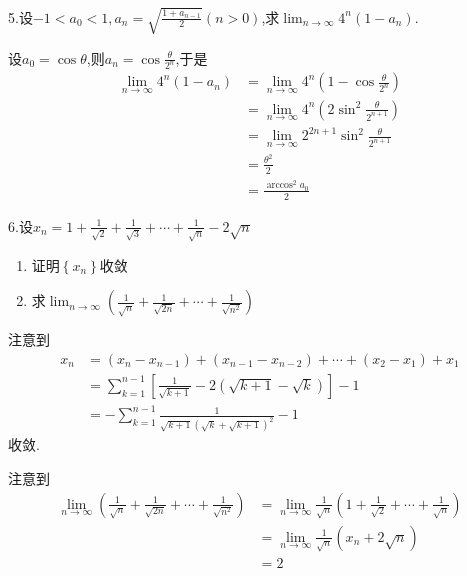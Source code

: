 5.设$\displaystyle -1<a_0<1,a_n=\sqrt{\frac{1+a_{n-1}}{2}}\left(n>0\right)$,求$\displaystyle\lim_{n\to\infty}4^n\left(1-a_n\right)$.
\begin{solution}
    设$a_0=\cos\theta$,则$\displaystyle a_n=\cos\frac{\theta}{2^n}$,于是\begin{align*}
        \lim_{n\to\infty}4^n\left(1-a_n\right)&=\lim_{n\to\infty}4^n\left(1-\cos\frac{\theta}{2^n}\right)\\
        &=\lim_{n\to\infty}4^n\left(2\sin^2\frac{\theta}{2^{n+1}}\right)\\
        &=\lim_{n\to\infty}2^{2n+1}\sin^2\frac{\theta}{2^{n+1}}\\
        &=\frac{\theta^2}{2}\\
        &=\frac{\arccos^2a_0}{2}
    \end{align*}
\end{solution}

6.设$\displaystyle x_n=1+\frac{1}{\sqrt{2}}+\frac{1}{\sqrt{3}}+\cdots+\frac{1}{\sqrt{n}}-2\sqrt{n}$\begin{enumerate}[label={\textup{(\arabic*)}}]
    \item 证明$\displaystyle\left\{x_n\right\}$收敛
    \item 求$\displaystyle\lim_{n\to\infty}\left(\frac{1}{\sqrt{n}}+\frac{1}{\sqrt{2n}}+\cdots+\frac{1}{\sqrt{n^2}}\right)$
\end{enumerate}
\begin{solution}
    注意到\begin{align*}
        x_n&=\left(
            x_{n}-x_{n-1}
        \right)+\left(
            x_{n-1}-x_{n-2}
        \right)+\cdots+\left(
            x_2-x_1
        \right)+x_1\\
        &=\sum_{k=1}^{n-1}\left[
            \frac{1}{\sqrt{k+1}}-2\left(
                \sqrt{k+1}-\sqrt{k}
            \right)
        \right]-1\\
        &=-\sum_{k=1}^{n-1}\frac{1}{\sqrt{k+1}\left(\sqrt{k}+\sqrt{k+1}\right)^2}-1
    \end{align*}收敛.

    注意到\begin{align*}
        \lim_{n\to\infty}\left(
            \frac{1}{\sqrt{n}}+\frac{1}{\sqrt{2n}}+\cdots+\frac{1}{\sqrt{n^2}}
        \right)&=\lim_{n\to\infty}\frac{1}{\sqrt{n}}\left(
            1+\frac{1}{\sqrt{2}}+\cdots+\frac{1}{\sqrt{n}}
        \right)\\
        &=\lim_{n\to\infty}\frac{1}{\sqrt{n}}\left(x_n+2\sqrt{n}\right)\\
        &=2
    \end{align*}
\end{solution}

